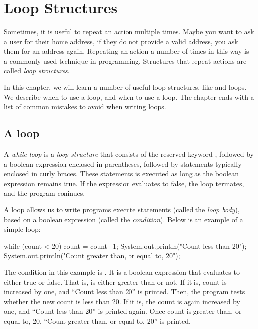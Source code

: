 \chapter{Loop Structures}

Sometimes, it is useful to repeat an action multiple times. Maybe you want to
ask a user for their home address, if they do not provide a valid address, you
ask them for an address again. Repeating an action a number of times in this way
is a commonly used technique in programming. Structures that repeat actions are
called \emph{loop structures}.

In this chapter, we will learn a number of useful loop structures, like
 and  loops. We describe when to use a  loop, and
when to use a  loop. The chapter ends with a list of common mistakes to
avoid when writing loops.

\section{A  loop}

\begin{definition}
A \emph{while loop} is a \emph{loop structure} that consists of the reserved
keyword , followed by a boolean expression enclosed in parentheses,
followed by statements typically enclosed in curly braces. These statements is
executed as long as the boolean expression remains true. If the expression
evaluates to false, the loop termates, and the program coninues.
\end{definition}

A  loop allows us to write programs execute statements
(called the \emph{loop body}), based on a boolean expression (called the \emph{condition}). Below is an example of a simple  loop:

\begin{code}
while (count < 20) {
  count = count+1;
  System.out.println("Count less than 20");
}
System.out.println("Count greater than, or equal to, 20");
\end{code}

\noindent The condition in this example is . It is a boolean
expression that evaluates to either true or false. That is,  is either
greater than  or not. If it is, count is increased by one, and ``Count
less than 20'' is printed. Then, the program tests whether the new count is less
than 20. If it is, the count is again increased by one, and ``Count less than
20'' is printed again. Once count is greater than, or equal to, 20, ``Count
greater than, or equal to, 20'' is printed.

